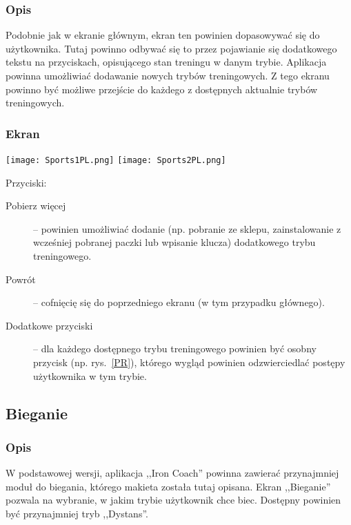 \subsubsection{Opis}
\noindent Podobnie jak w ekranie głównym, ekran ten powinien dopasowywać się do użytkownika. Tutaj powinno odbywać się to przez pojawianie się dodatkowego tekstu na przyciskach, opisującego stan treningu w danym trybie. Aplikacja powinna umożliwiać dodawanie nowych trybów treningowych. Z tego ekranu powinno być możliwe przejście do każdego z dostępnych aktualnie trybów treningowych.
\subsubsection{Ekran}
\begin{minipage}{0.5\textwidth}
  \label{S1}
  \texttt{[image: Sports1PL.png]}
  \label{S2}
  \texttt{[image: Sports2PL.png]}
\end{minipage}
\begin{minipage}{0.5\textwidth}
Przyciski:\\
\begin{description}
  \item[Pobierz więcej] -- powinien umożliwiać dodanie (np. pobranie ze sklepu, zainstalowanie z wcześniej pobranej paczki lub wpisanie klucza) dodatkowego trybu treningowego.
  \item[Powrót] -- cofnięcię się do poprzedniego ekranu (w tym przypadku głównego).
  \item[Dodatkowe przyciski] -- dla każdego dostępnego trybu treningowego powinien być osobny przycisk (np. rys.~\ref{PR}), którego wygląd powinien odzwierciedlać postępy użytkownika w tym trybie.
\end{description}
\end{minipage}
\subsection{Bieganie}
\subsubsection{Opis}
\noindent W podstawowej wersji, aplikacja ,,Iron Coach'' powinna zawierać przynajmniej moduł do biegania, którego makieta została tutaj opisana. Ekran ,,Bieganie'' pozwala na wybranie, w jakim trybie użytkownik chce biec. Dostępny powinien być przynajmniej tryb ,,Dystans''.
